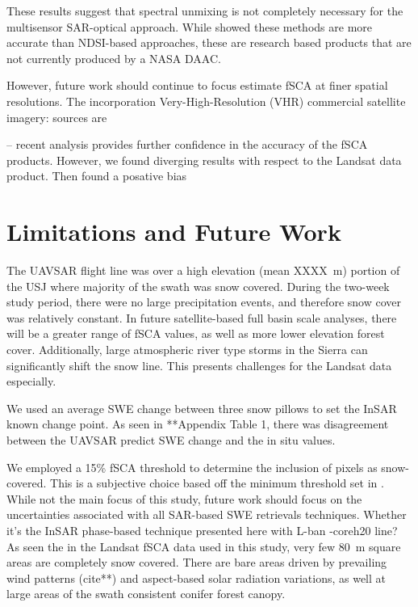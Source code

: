 These results suggest that spectral unmixing is not completely necessary for the multisensor SAR-optical approach. While \cite{stillingerLandsatMODISVIIRS2023a} showed these methods are more accurate than NDSI-based approaches, these are research based products that are not currently produced by a NASA DAAC. 

However, future work should continue to focus estimate fSCA at finer spatial resolutions. The incorporation Very-High-Resolution (VHR) commercial satellite imagery: sources are \citep{huImprovingMountainSnow2022, thalerEstimatingSnowCover2023,yangHighresolutionMappingSnow2023,johnHighResolutionSnowCoveredArea2022}


-- \cite{stillingerLandsatMODISVIIRS2023} recent analysis provides further confidence in the accuracy of the fSCA products. However, we found diverging results with respect to the Landsat data product. Then found a posative bias 

\hypertarget{ch5-discussion-2}{\section{Limitations and Future Work}\label{ch4-discussion-2}}

The UAVSAR flight line was over a high elevation (mean XXXX~m) portion of the USJ where majority of the swath was snow covered. During the two-week study period, there were no large precipitation events, and therefore snow cover was relatively constant. In future satellite-based full basin scale analyses, there will be a greater range of fSCA values, as well as more lower elevation forest cover. Additionally, large atmospheric river type storms in the Sierra can significantly shift the snow line. This presents challenges for the Landsat data especially.

We used an average SWE change between three snow pillows to set the InSAR known change point. As seen in **Appendix Table 1, there was disagreement between the UAVSAR predict SWE change and the in situ values. 



We employed a 15\% fSCA threshold to determine the inclusion of pixels as snow-covered. This is a subjective choice based off the minimum threshold set in \cite{painterRetrievalSubpixelSnow2009}. While not the main focus of this study, future work should focus on the uncertainties associated with all SAR-based SWE retrievals techniques. Whether it's the InSAR phase-based technique presented here with L-ban 
-coreh20 line?
As seen the in the Landsat fSCA data used in this study, very few 80~m square areas are completely snow covered. There are bare areas driven by prevailing wind patterns (cite**) and aspect-based solar radiation variations, as well at large areas of the swath consistent conifer forest canopy.




